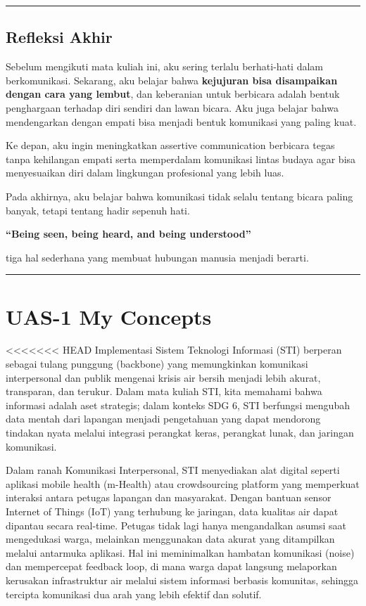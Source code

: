 \documentclass[
  letterpaper,
  DIV=11,
  numbers=noendperiod]{scrreprt}
\begin{document}
\begin{center}\rule{0.5\linewidth}{0.5pt}\end{center}

\section{Refleksi Akhir}\label{refleksi-akhir}

Sebelum mengikuti mata kuliah ini, aku sering terlalu berhati-hati dalam
berkomunikasi. Sekarang, aku belajar bahwa \textbf{kejujuran bisa
disampaikan dengan cara yang lembut}, dan keberanian untuk berbicara
adalah bentuk penghargaan terhadap diri sendiri dan lawan bicara. Aku
juga belajar bahwa mendengarkan dengan empati bisa menjadi bentuk
komunikasi yang paling kuat.

Ke depan, aku ingin meningkatkan assertive communication berbicara tegas
tanpa kehilangan empati serta memperdalam komunikasi lintas budaya agar
bisa menyesuaikan diri dalam lingkungan profesional yang lebih luas.

Pada akhirnya, aku belajar bahwa komunikasi tidak selalu tentang bicara
paling banyak, tetapi tentang hadir sepenuh hati.

\textbf{``Being seen, being heard, and being understood''}

tiga hal sederhana yang membuat hubungan manusia menjadi berarti.

\begin{center}\rule{0.5\linewidth}{0.5pt}\end{center}


\chapter{UAS-1 My Concepts}\label{uas-1-my-concepts}

\textless\textless\textless\textless\textless\textless\textless{} HEAD
Implementasi Sistem Teknologi Informasi (STI) berperan sebagai tulang
punggung (backbone) yang memungkinkan komunikasi interpersonal dan
publik mengenai krisis air bersih menjadi lebih akurat, transparan, dan
terukur. Dalam mata kuliah STI, kita memahami bahwa informasi adalah
aset strategis; dalam konteks SDG 6, STI berfungsi mengubah data mentah
dari lapangan menjadi pengetahuan yang dapat mendorong tindakan nyata
melalui integrasi perangkat keras, perangkat lunak, dan jaringan
komunikasi.

Dalam ranah Komunikasi Interpersonal, STI menyediakan alat digital
seperti aplikasi mobile health (m-Health) atau crowdsourcing platform
yang memperkuat interaksi antara petugas lapangan dan masyarakat. Dengan
bantuan sensor Internet of Things (IoT) yang terhubung ke jaringan, data
kualitas air dapat dipantau secara real-time. Petugas tidak lagi hanya
mengandalkan asumsi saat mengedukasi warga, melainkan menggunakan data
akurat yang ditampilkan melalui antarmuka aplikasi. Hal ini meminimalkan
hambatan komunikasi (noise) dan mempercepat feedback loop, di mana warga
dapat langsung melaporkan kerusakan infrastruktur air melalui sistem
informasi berbasis komunitas, sehingga tercipta komunikasi dua arah yang
lebih efektif dan solutif.
\end{document}
